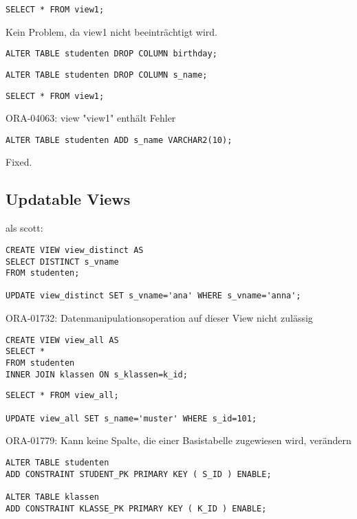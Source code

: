 \documentclass[10pt]{scrreprt}
\begin{document}
\begin{lstlisting}[style=sql]
SELECT * FROM view1;
\end{lstlisting}
Kein Problem, da view1 nicht beeinträchtigt wird.

\begin{lstlisting}[style=sql]
ALTER TABLE studenten DROP COLUMN birthday;
\end{lstlisting}

\begin{lstlisting}[style=sql]
ALTER TABLE studenten DROP COLUMN s_name;
\end{lstlisting}

\begin{lstlisting}[style=sql]
SELECT * FROM view1;
\end{lstlisting}
ORA-04063: view "view1" enthält Fehler

\begin{lstlisting}[style=sql]
ALTER TABLE studenten ADD s_name VARCHAR2(10);
\end{lstlisting}
Fixed.

\subsection{Updatable Views}
als scott:
\begin{lstlisting}[style=sql]
CREATE VIEW view_distinct AS
SELECT DISTINCT s_vname
FROM studenten;

UPDATE view_distinct SET s_vname='ana' WHERE s_vname='anna';
\end{lstlisting}
ORA-01732: Datenmanipulationsoperation auf dieser View nicht zulässig

\begin{lstlisting}[style=sql]
CREATE VIEW view_all AS
SELECT *
FROM studenten
INNER JOIN klassen ON s_klassen=k_id;
\end{lstlisting}

\begin{lstlisting}[style=sql]
SELECT * FROM view_all;

UPDATE view_all SET s_name='muster' WHERE s_id=101;
\end{lstlisting}
ORA-01779: Kann keine Spalte, die einer Basistabelle zugewiesen wird, verändern

\begin{lstlisting}[style=sql]
ALTER TABLE studenten
ADD CONSTRAINT STUDENT_PK PRIMARY KEY ( S_ID ) ENABLE;

ALTER TABLE klassen
ADD CONSTRAINT KLASSE_PK PRIMARY KEY ( K_ID ) ENABLE;
\end{lstlisting}
\end{document}
